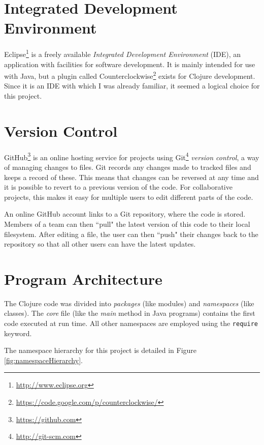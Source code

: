 \section{Integrated Development Environment}

Eclipse\footnote{\url{http://www.eclipse.org}} is a freely available \textit{Integrated Development Environment} (IDE), an application with facilities for software development. It is mainly intended for use with Java, but a plugin called Counterclockwise\footnote{\url{https://code.google.com/p/counterclockwise/}} exists for Clojure development. Since it is an IDE with which I was already familiar, it seemed a logical choice for this project. 

\section{Version Control}

GitHub\footnote{\url{https://github.com}} is an online hosting service for projects using Git\footnote{\url{http://git-scm.com}} \textit{version control}, a way of managing changes to files. Git records any changes made to tracked files and keeps a record of these. This means that changes can be reversed at any time and it is possible to revert to a previous version of the code. For collaborative projects, this makes it easy for multiple users to edit different parts of the code. 

An online GitHub account links to a Git repository, where the code is stored. Members of a team can then ``pull" the latest version of this code to their local filesystem. After editing a file, the user can then ``push" their changes back to the repository so that all other users can have the latest updates. 

\section{Program Architecture}

The Clojure code was divided into \textit{packages} (like modules) and \textit{namespaces} (like classes). The \textit{core} file (like the \textit{main} method in Java programs) contains the first code executed at run time. All other namespaces are employed using the \lstinline!require! keyword. 

The namespace hierarchy for this project is detailed in Figure \ref{fig:namespaceHierarchy}.



